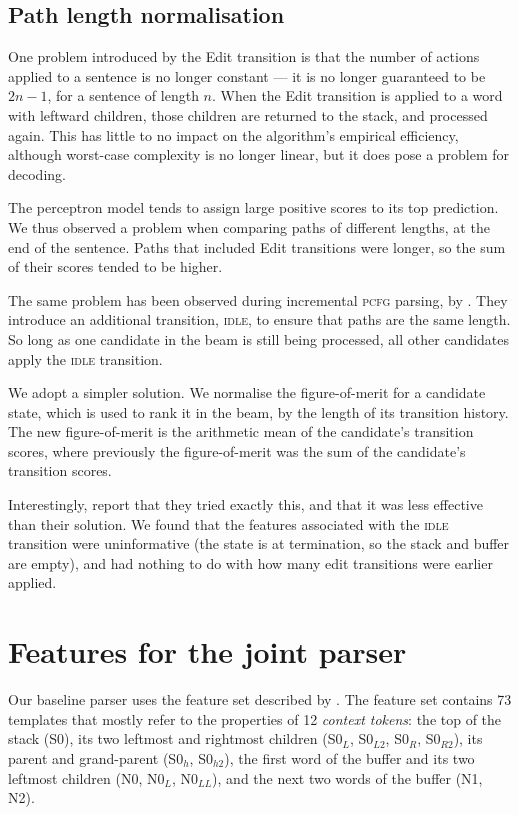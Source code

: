 \documentclass[11pt,letterpaper]{article}
\newcommand{\szero}{S0\xspace}
\newcommand{\nzero}{N0\xspace}
\newcommand{\szeroH}{S0$_h$\xspace}
\newcommand{\szeroHH}{S0$_{h2}$\xspace}
\newcommand{\szeroL}{S0$_L$\xspace}
\newcommand{\szeroLL}{S0$_{L2}$\xspace}
\newcommand{\szeroR}{S0$_R$\xspace}
\newcommand{\szeroRR}{S0$_{R2}$\xspace}
\newcommand{\nzeroL}{N0$_L$\xspace}
\newcommand{\nzeroLL}{N0$_{LL}$\xspace}
\begin{document}
\subsection{Path length normalisation}

One problem introduced by the Edit transition is that the number of
actions applied to a sentence is no longer constant --- it is no longer guaranteed
to be $2n-1$, for a sentence of length $n$. When the Edit transition is
applied to a word with leftward children, those children are returned to the stack,
and processed again.  This has little to no impact on the algorithm's empirical
efficiency, although worst-case complexity is no longer linear, but it does
pose a problem for decoding.

The perceptron model tends to assign large positive scores to its top
prediction.
We thus observed a problem when comparing paths of different lengths, at the end
of the sentence. Paths that included Edit transitions were longer,
so the sum of their scores tended to be higher.

The same problem has been observed during incremental \textsc{pcfg} parsing,
by \citet{zhu:13}.  They introduce an additional transition, \textsc{idle},
to ensure that paths are the same length. So long as one candidate in the beam
is still being processed, all other candidates apply the \textsc{idle} transition.

We adopt a simpler solution.  We normalise the figure-of-merit for a candidate
state, which is used to rank
it in the beam, by the length of its transition history. The
new figure-of-merit is the arithmetic mean of the candidate's transition scores,
where previously the figure-of-merit was the sum of the candidate's transition
scores.

Interestingly, \citet{zhu:13} report that they tried exactly this, and that it
was less effective than their solution. We found that the features
associated with the \textsc{idle} transition were uninformative (the state is at
termination, so the stack and buffer are empty), and had nothing to do with how
many edit transitions were earlier applied.

\section{Features for the joint parser}
\label{sec:features}

Our baseline parser uses the feature set described by \citet{zhang:11}.
The feature set contains 73 templates that mostly refer to the properties of
12 \emph{context tokens}: the top of the stack (\szero), its two leftmost and
rightmost children (\szeroL, \szeroLL, \szeroR, \szeroRR), its parent and
grand-parent (\szeroH, \szeroHH), the first word of the buffer and its two leftmost
children (\nzero, \nzeroL, \nzeroLL), and the next two words of the buffer (N1, N2).
\end{document}
